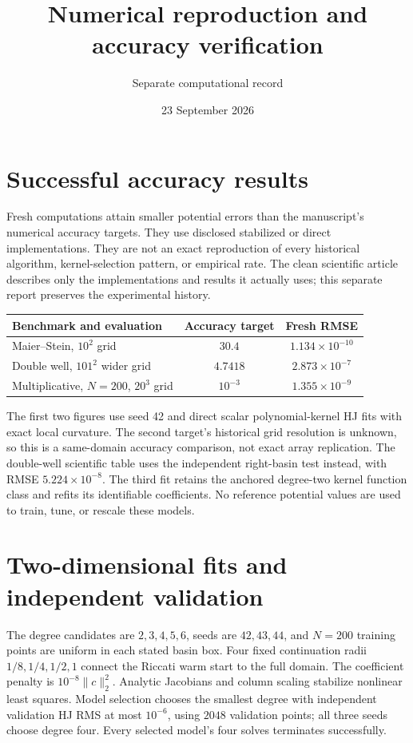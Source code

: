 \documentclass[11pt,a4paper]{article}
\title{Numerical reproduction and accuracy verification}
\author{Separate computational record}\date{23 September 2026}
\begin{document}
\maketitle
\section*{Successful accuracy results}
Fresh computations attain smaller potential errors than the manuscript's numerical accuracy targets. They use disclosed stabilized or direct implementations. They are not an exact reproduction of every historical algorithm, kernel-selection pattern, or empirical rate. The clean scientific article describes only the implementations and results it actually uses; this separate report preserves the experimental history.

\begin{center}\small\begin{tabular}{lcc}\toprule
Benchmark and evaluation & Accuracy target & Fresh RMSE\\\midrule
Maier--Stein, $10^2$ grid & $30.4$ & $1.134\times10^{-10}$\\
Double well, $101^2$ wider grid & $4.7418$ & $2.873\times10^{-7}$\\
Multiplicative, $N=200$, $20^3$ grid & $10^{-3}$ & $1.355\times10^{-9}$\\\bottomrule
\end{tabular}\end{center}
The first two figures use seed 42 and direct scalar polynomial-kernel HJ fits with exact local curvature. The second target's historical grid resolution is unknown, so this is a same-domain accuracy comparison, not exact array replication. The double-well scientific table uses the independent right-basin test instead, with RMSE $5.224\times10^{-8}$. The third fit retains the anchored degree-two kernel function class and refits its identifiable coefficients. No reference potential values are used to train, tune, or rescale these models.

\section*{Two-dimensional fits and independent validation}
The degree candidates are $2,3,4,5,6$, seeds are $42,43,44$, and $N=200$ training points are uniform in each stated basin box. Four fixed continuation radii $1/8,1/4,1/2,1$ connect the Riccati warm start to the full domain. The coefficient penalty is $10^{-8}\|c\|_2^2$. Analytic Jacobians and column scaling stabilize nonlinear least squares. Model selection chooses the smallest degree with independent validation HJ RMS at most $10^{-6}$, using $2048$ validation points; all three seeds choose degree four. Every selected model's four solves terminates successfully.
\end{document}
